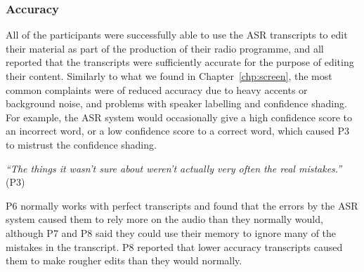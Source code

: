 \subsubsection{Accuracy}

All of the participants were successfully able to use the ASR transcripts to edit their material as
part of the production of their radio programme, and all reported that the transcripts were sufficiently accurate for
the purpose of editing their content. Similarly to what we found in Chapter~\ref{chp:screen}, the most common
complaints were of reduced accuracy due to heavy accents or background noise, and problems with speaker labelling and
confidence shading. For example, the ASR system would occasionally give a high confidence score to an
incorrect word, or a low confidence score to a correct word, which caused P3 to mistrust the confidence shading.

\textit{``The things it wasn't sure about weren't actually very often the real mistakes.''} (P3)



P6 normally works with perfect transcripts and found that the errors by the ASR system caused them to rely more on
the audio than they normally would, although P7 and P8 said they could use their memory to ignore many of the mistakes
in the transcript.  P8 reported that lower accuracy transcripts caused them to make rougher edits than they would
normally.





